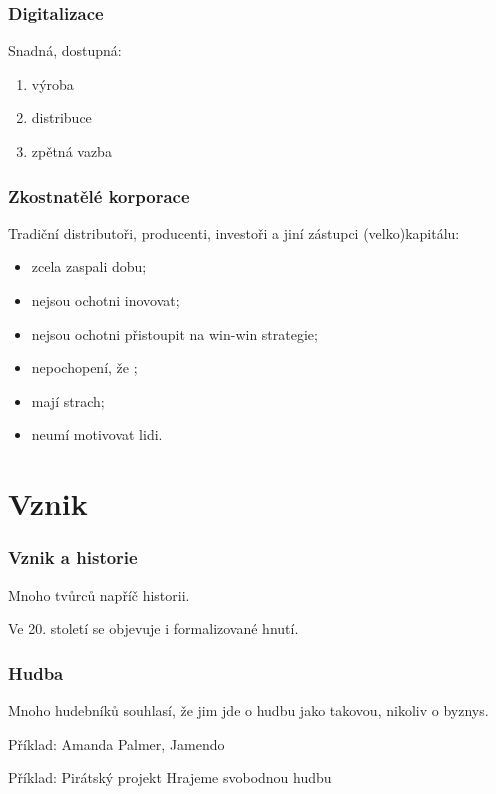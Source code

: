 \documentclass[xetex]{beamer}
\begin{document}
\begin{frame}
	\frametitle{Digitalizace}
	
	Snadná, dostupná:
	\begin{enumerate}
		\item výroba
		\item distribuce
		\item zpětná vazba
	\end{enumerate}
\end{frame}

\begin{frame}
 \frametitle{Zkostnatělé korporace}
Tradiční distributoři, producenti, investoři a jiní zástupci (velko)kapitálu:
 \begin{itemize}
  \item zcela zaspali dobu;
  \item nejsou ochotni inovovat;
  \item nejsou ochotni přistoupit na win-win strategie;
  \item nepochopení, že ;
  \item mají strach;
  \item neumí motivovat lidi.
 \end{itemize}
\end{frame}

\section{Vznik}

\begin{frame}
	\frametitle{Vznik a historie}
	Mnoho tvůrců napříč historii. 
	
	\bigskip
	
	Ve 20. století se objevuje i formalizované hnutí. 
\end{frame}

\begin{frame}
	\frametitle{Hudba}
	Mnoho hudebníků souhlasí, že jim jde o hudbu jako takovou, nikoliv o byznys.
	
	\bigskip
	
	Příklad: Amanda Palmer, Jamendo
	
	\bigskip
	
	Příklad: Pirátský projekt Hrajeme svobodnou hudbu
\end{frame}
\end{document}
